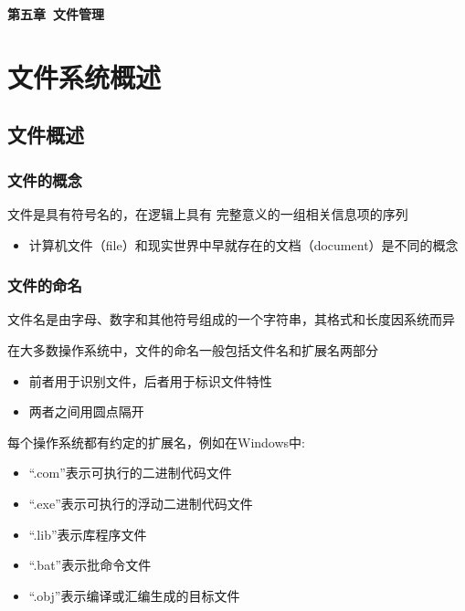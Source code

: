 \documentclass[cs4size,a4paper,10pt]{ctexart}
\begin{document}
	\begin{center}
		{\huge\textbf{第五章\ 文件管理}}
	\end{center}
	\tableofcontents
	\clearpage

	\setcounter{page}{1}
	\setlength{\parskip}{0.65em}

	\section{文件系统概述}
	\subsection{文件概述}

	\subsubsection{文件的概念}
	文件是具有符号名的，在逻辑上具有 完整意义的一组相关信息项的序列
	\begin{itemize}
		\item 计算机文件（file）和现实世界中早就存在的文档（document）是不同的概念
	\end{itemize}

	\subsubsection{文件的命名}
	文件名是由字母、数字和其他符号组成的一个字符串，其格式和长度因系统而异

	在大多数操作系统中，文件的命名一般包括文件名和扩展名两部分
	\begin{itemize}
		\item 前者用于识别文件，后者用于标识文件特性
		\item 两者之间用圆点隔开
	\end{itemize}

	每个操作系统都有约定的扩展名，例如在Windows中:
	\begin{itemize}
		\item “.com”表示可执行的二进制代码文件
		\item “.exe”表示可执行的浮动二进制代码文件
		\item “.lib”表示库程序文件
		\item “.bat”表示批命令文件
		\item “.obj”表示编译或汇编生成的目标文件
	\end{itemize}
\end{document}
